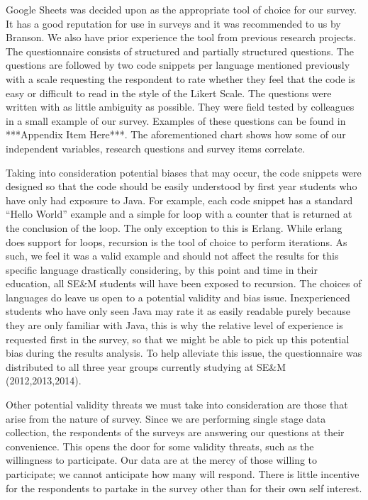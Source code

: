 \documentclass[times, 10pt,twocolumn]{IEEEtran}
\begin{document}
Google Sheets was decided upon as the appropriate tool of choice for our survey. It has a good reputation for use in surveys and it was recommended to us by Branson. We also have prior experience the tool from previous research projects.
The questionnaire consists of structured and partially structured questions. The questions are followed by two code snippets per language mentioned previously with a scale requesting the respondent to rate whether they feel that the code is easy or difficult to read in the style of the Likert Scale. The questions were written with as little ambiguity as possible. They were field tested by colleagues in a small example of our survey. Examples of these questions can be found in ***Appendix Item Here***. The aforementioned chart shows how some of our independent variables, research questions and survey items correlate.

Taking into consideration potential biases that may occur, the code snippets were designed so that the code should be easily understood by first year students who have only had exposure to Java. For example, each code snippet has a standard ``Hello World'' example and a simple for loop with a counter that is returned at the conclusion of the loop. The only exception to this is Erlang. While erlang does support for loops, recursion is the tool of choice to perform iterations. As such, we feel it was a valid example and should not affect the results for this specific language drastically considering, by this point and time in their education, all SE\&M students will have been exposed to recursion. The choices of languages do leave us open to a potential validity and bias issue. Inexperienced students who have only seen Java may rate it as easily readable purely because they are only familiar with Java, this is why the relative level of experience is requested first in the survey, so that we might be able to pick up this potential bias during the results analysis. To help alleviate this issue, the questionnaire was distributed to all three year groups currently studying at SE\&M (2012,2013,2014).

Other potential validity threats we must take into consideration are those that arise from the nature of survey. Since we are performing single stage data collection, the respondents of the surveys are answering our questions at their convenience. This opens the door for some validity threats, such as the willingness to participate. Our data are at the mercy of those willing to participate; we cannot anticipate how many will respond. There is little incentive for the respondents to partake in the survey other than for their own self interest.
\end{document}
